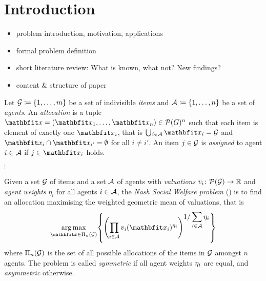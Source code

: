 \section{Introduction}
\label{sec:intro}

\begin{itemize}
	\item
	problem introduction, motivation, applications

	\item
	formal problem definition

	\item
	short literature review: What is known, what not? New findings?

	\item
	content \& structure of paper
\end{itemize}

\begin{definition}
	Let \(\mathcal{G} \coloneq \{1, \dots, m\}\) be a set of indivisible \emph{items} and \(\mathcal{A} \coloneq \{1, \dots, n\}\) be a set of \emph{agents}.
	An \emph{allocation} is a tuple \(\alloc = ( \alloc[1], \dots, \alloc[n] ) \in \powerset[G]^n\) such that each item is element of exactly one \(\alloc[i]\), that is \(\mathop{\bigcup\hspace{-1pt}_{i \in \agents}} \alloc[i] = \goods\) and \(\alloc[i] \cap \alloc[i'] = \emptyset\) for all \(i \neq i'\).
	An item \(j \in \mathcal{G}\) is \emph{assigned} to agent \(i \in \mathcal{A}\) if \(j \in \alloc[i]\) holds.
\end{definition}

\(\vdots\)

\begin{definition}
	Given a set \(\mathcal{G}\) of items and a set \(\mathcal{A}\) of agents with \emph{valuations} \(\valuations[i] \colon \powerset[\goods] \to \real\) and \emph{agent weights} \(\eta_i\) for all agents \(i \in \mathcal{A}\), the \emph{Nash Social Welfare problem} (\NSW) is to find an allocation maximising the weighted geometric mean of valuations, that is
	\begin{equation*}
		\argmax_{\alloc \in \allallocs{n}{\goods}} \left\{ \left( \prod_{i \in \agents} \valuations[i][\alloc[i]]^{\weight{i}} \right)^{\displaystyle 1 / \sum_{i \in \agents} \weight{i}} \right\}
	\end{equation*}
	where \(\Pi_{n}(\mathcal{G})\) is the set of all possible allocations of the items in \(\mathcal{G}\) amongst \(n\) agents.
	The problem is called \emph{symmetric} if all agent weights \(\eta_{i}\) are equal, and \emph{asymmetric} otherwise.
\end{definition}

